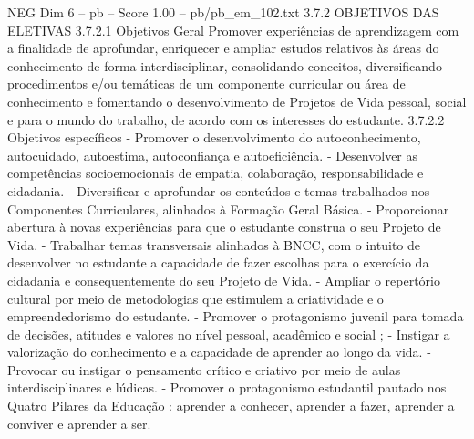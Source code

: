 \begin{textsample}{NEG Dim 6 – pb – Score 1.00 – pb/pb\_em\_102.txt}  \label{ex:f6_neg_086}
3.7.2 OBJETIVOS DAS ELETIVAS 3.7.2.1 Objetivos Geral Promover experiências de aprendizagem com a finalidade de aprofundar, enriquecer e ampliar estudos relativos às áreas do conhecimento de forma interdisciplinar, consolidando conceitos, diversificando procedimentos e/ou temáticas de um componente curricular ou área de conhecimento e fomentando o desenvolvimento de Projetos de Vida pessoal, social e para o mundo do trabalho, de acordo com os interesses do estudante. 3.7.2.2 Objetivos específicos - Promover o desenvolvimento do autoconhecimento, autocuidado, autoestima, autoconfiança e autoeficiência. - Desenvolver as competências socioemocionais de empatia, colaboração, responsabilidade e cidadania. - Diversificar e aprofundar os conteúdos e temas trabalhados nos Componentes Curriculares, alinhados à Formação Geral Básica. - Proporcionar abertura à novas experiências para que o estudante construa o seu Projeto de Vida. - Trabalhar temas transversais alinhados à BNCC, com o intuito de desenvolver no estudante a capacidade de fazer escolhas para o exercício da cidadania e consequentemente do seu Projeto de Vida. - Ampliar o repertório cultural por meio de metodologias que estimulem a criatividade e o empreendedorismo do estudante. - Promover o protagonismo juvenil para tomada de decisões, atitudes e valores no nível pessoal, acadêmico e social ; - Instigar a valorização do conhecimento e a capacidade de aprender ao longo da vida. - Provocar ou instigar o pensamento crítico e criativo por meio de aulas interdisciplinares e lúdicas. - Promover o protagonismo estudantil pautado nos Quatro Pilares da Educação : aprender a conhecer, aprender a fazer, aprender a conviver e aprender a ser.

\end{textsample}
